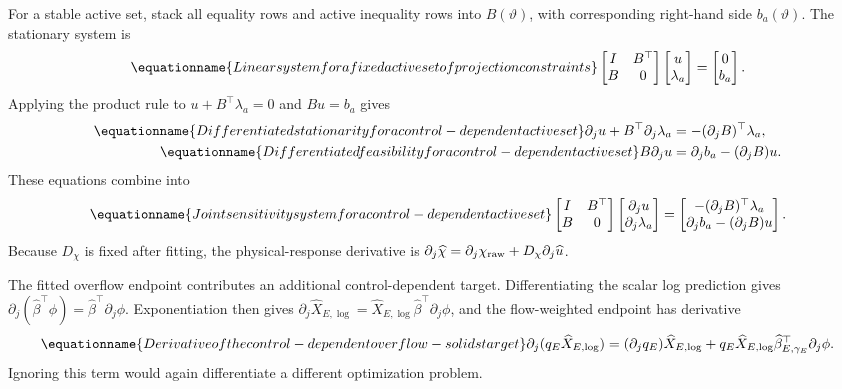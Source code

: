 For a stable active set, stack all equality rows and active inequality rows into $B(\vartheta)$, with corresponding right-hand side $b_a(\vartheta)$. The stationary system is
\begin{equation}
\equationname{Linear system for a fixed active set of projection constraints}
\begin{bmatrix}I&B^\top\\B&0\end{bmatrix}
\begin{bmatrix}u\\\lambda_a\end{bmatrix}
=\begin{bmatrix}0\\b_a\end{bmatrix}.
\label{eq:plant_active_system}
\end{equation}
Applying the product rule to $u+B^\top\lambda_a=0$ and $Bu=b_a$ gives
\begin{align}
\equationname{Differentiated stationarity for a control-dependent active set}
\partial_j u+B^\top\partial_j\lambda_a&=-(\partial_jB)^\top\lambda_a,\\
\equationname{Differentiated feasibility for a control-dependent active set}
B\partial_j u&=\partial_jb_a-(\partial_jB)u.
\end{align}
These equations combine into
\begin{equation}
\equationname{Joint sensitivity system for a control-dependent active set}
\begin{bmatrix}I&B^\top\\B&0\end{bmatrix}
\begin{bmatrix}\partial_j u\\\partial_j\lambda_a\end{bmatrix}
=\begin{bmatrix}-(\partial_jB)^\top\lambda_a\\
\partial_jb_a-(\partial_jB)u\end{bmatrix}.
\label{eq:plant_active_sensitivity}
\end{equation}
Because $D_\chi$ is fixed after fitting, the physical-response derivative is $\partial_j\widehat\chi=\partial_j\chi_{\rm raw}+D_\chi\partial_j\widehat u$.

The fitted overflow endpoint contributes an additional control-dependent target. Differentiating the scalar log prediction gives $\partial_j(\widehat\beta^\top\phi)=\widehat\beta^\top\partial_j\phi$. Exponentiation then gives $\partial_j\widehat X_{E,\log}=\widehat X_{E,\log}\widehat\beta^\top\partial_j\phi$, and the flow-weighted endpoint has derivative
\begin{equation}
\equationname{Derivative of the control-dependent overflow-solids target}
\partial_j(q_E\widehat X_{E,\log})
=(\partial_jq_E)\widehat X_{E,\log}
+q_E\widehat X_{E,\log}\widehat\beta_{E,\gamma_E}^\top\partial_j\phi.
\end{equation}
Ignoring this term would again differentiate a different optimization problem.

